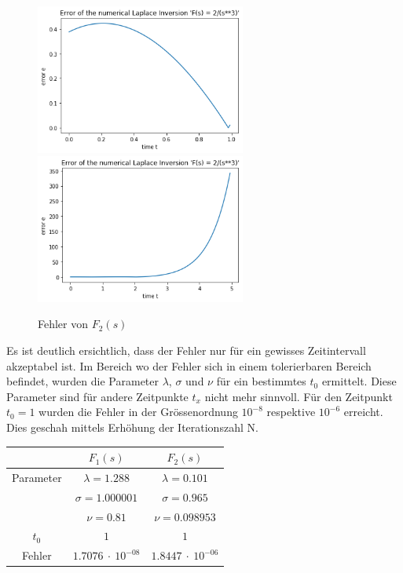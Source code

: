 
\begin{figure}
\centering
\includegraphics[width=6.9cm]{papers/laplace/Error_2divide_s_pow3}
\includegraphics[width=6.9cm]{papers/laplace/Error_2divide_s_pow3_bis_tgleich5}
\caption{Fehler von $F_{2}(s)$
\label{laplace:fehlerf2}
}
\end{figure}



Es ist deutlich ersichtlich, dass der Fehler nur für ein gewisses
Zeitintervall akzeptabel ist. Im Bereich wo der Fehler sich in einem
tolerierbaren Bereich befindet, wurden die Parameter $\lambda$,
$\sigma$ und $\nu$ für ein bestimmtes $t_{0}$ ermittelt.
Diese Parameter sind für andere Zeitpunkte $t_{x}$ nicht mehr sinnvoll. 
Für den Zeitpunkt $t_{0}=1$ wurden die Fehler in der Grössenordnung $10^{-8}$ respektive $10^{-6}$ erreicht. 
Dies geschah mittels Erhöhung der Iterationszahl N.

\begin{center}
\begin{tabular}[c]{c|c|c}
& $F_{1}(s)$ & $F_{2}(s)$ \\
\hline
Parameter & $\lambda=1.288$ & $\lambda=0.101$ \\
 & $\sigma=1.000001$ & $\sigma=0.965$ \\
 & $\nu=0.81$ & $\nu=0.098953$ \\
\hline
$t_{0}$ & $1$ & $1$ \\
\hline
Fehler & $1.7076~\cdot~10^{-08}$ & $1.8447~\cdot~10^{-06}$ \\
\end{tabular}
\end{center}


